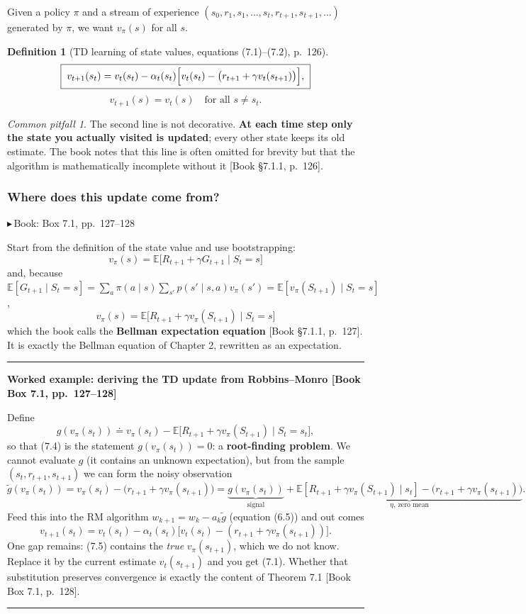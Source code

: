 \documentclass[11pt, letterpaper]{article}
\theoremstyle{runin}
\newtheorem*{definition}{Definition}
\theoremstyle{runinplain}
\theoremstyle{remark}
\newtheorem*{warning}{Common pitfall}
\newcommand{\E}{\mathbb{E}}
\newcommand{\bk}[1]{{\color{bookblue}\small$\blacktriangleright$\,\textsf{Book: #1}}}
\newcommand{\bkin}[1]{{\color{bookblue}\small[\textsf{Book #1}]}}
\newenvironment{worked}[1]
  {\par\medskip\noindent\rule{\textwidth}{0.4pt}\par\nobreak\vspace{0.3em}
   \noindent\textbf{Worked example: #1}\par\nobreak\vspace{0.2em}\small}
  {\par\nobreak\vspace{0.3em}\noindent\rule{\textwidth}{0.4pt}\par\medskip}
\begin{document}
Given a policy $\pi$ and a stream of experience
$(s_0,r_1,s_1,\dots,s_t,r_{t+1},s_{t+1},\dots)$ generated by $\pi$, we want
$v_\pi(s)$ for all $s$.

\begin{definition}[TD learning of state values, equations (7.1)--(7.2), p.~126]
\[
  \boxed{\;
  v_{t+1}(s_t)=v_t(s_t)-\alpha_t(s_t)\Bigl[v_t(s_t)-\bigl(r_{t+1}+\gamma v_t(s_{t+1})\bigr)\Bigr],
  \;}
\]
\[
  v_{t+1}(s)=v_t(s)\quad\text{for all }s\neq s_t .
\]
\end{definition}

\begin{warning}
The second line is not decorative. \textbf{At each time step only the state you
actually visited is updated}; every other state keeps its old estimate. The book
notes that this line is often omitted for brevity but that the algorithm is
mathematically incomplete without it \bkin{\S7.1.1, p.~126}.
\end{warning}

\subsubsection{Where does this update come from?}

\bk{Box 7.1, pp.~127--128}

Start from the definition of the state value and use bootstrapping:
\[
  v_\pi(s)=\E\bigl[R_{t+1}+\gamma G_{t+1}\mid S_t=s\bigr]
  \tag{7.3}
\]
and, because
$\E[G_{t+1}\mid S_t=s]=\sum_a\pi(a\mid s)\sum_{s'}p(s'\mid s,a)v_\pi(s')=\E[v_\pi(S_{t+1})\mid S_t=s]$,
\[
  \boxed{\;v_\pi(s)=\E\bigl[R_{t+1}+\gamma v_\pi(S_{t+1})\mid S_t=s\bigr]\;}
  \tag{7.4}
\]
which the book calls the \textbf{Bellman expectation equation}
\bkin{\S7.1.1, p.~127}. It is exactly the Bellman equation of Chapter 2, rewritten
as an expectation.

\begin{worked}{deriving the TD update from Robbins--Monro \bkin{Box 7.1, pp.~127--128}}
Define
\[
  g(v_\pi(s_t))\doteq v_\pi(s_t)-\E\bigl[R_{t+1}+\gamma v_\pi(S_{t+1})\mid S_t=s_t\bigr],
\]
so that (7.4) is the statement $g(v_\pi(s_t))=0$: a \textbf{root-finding problem}.
We cannot evaluate $g$ (it contains an unknown expectation), but from the sample
$(s_t,r_{t+1},s_{t+1})$ we can form the noisy observation
\[
  \tilde g(v_\pi(s_t))=v_\pi(s_t)-\bigl(r_{t+1}+\gamma v_\pi(s_{t+1})\bigr)
  = \underbrace{g(v_\pi(s_t))}_{\text{signal}}
   +\underbrace{\E[R_{t+1}+\gamma v_\pi(S_{t+1})\mid s_t]-\bigl(r_{t+1}+\gamma v_\pi(s_{t+1})\bigr)}_{\eta,\ \text{zero mean}} .
\]
Feed this into the RM algorithm $w_{k+1}=w_k-a_k\tilde g$ (equation (6.5)) and out
comes
\[
  v_{t+1}(s_t)=v_t(s_t)-\alpha_t(s_t)\bigl[v_t(s_t)-(r_{t+1}+\gamma v_\pi(s_{t+1}))\bigr].
  \tag{7.5}
\]
One gap remains: (7.5) contains the \emph{true} $v_\pi(s_{t+1})$, which we do not
know. Replace it by the current estimate $v_t(s_{t+1})$ and you get (7.1). Whether
that substitution preserves convergence is exactly the content of Theorem 7.1
\bkin{Box 7.1, p.~128}.
\end{worked}
\end{document}
